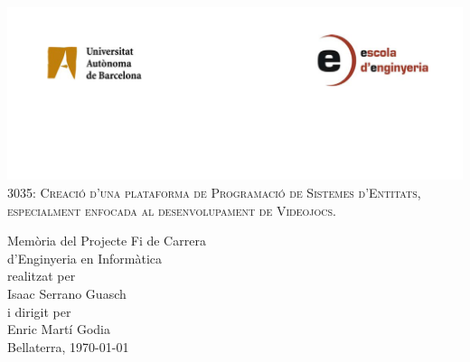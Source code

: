\begin{titlepage}

\begin{center}


\includegraphics[width=1.00\textwidth]{./img/logoUAB.png}\\[1cm]    

\textsc{\LARGE 3035: Creació d'una plataforma de Programació de Sistemes d'Entitats, especialment enfocada al desenvolupament de Videojocs.}\\[1.5cm]



\end{center}

\begin{flushright}

\vfill

\begin{minipage}{0.4\textwidth}
\end{minipage}
\begin{minipage}{0.6\textwidth}
Memòria del Projecte Fi de Carrera \\
d'Enginyeria en Informàtica \\
realitzat per \\
Isaac Serrano Guasch \\
i dirigit per \\
Enric Martí Godia \\
Bellaterra, \today
\end{minipage}

\end{flushright}

\end{titlepage}
